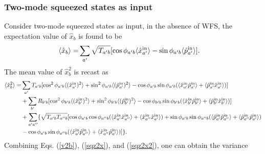 \documentclass[9pt,twocolumn,twoside]{osajnl}
\begin{document}
\subsubsection{Two-mode squeezed states as input}
\label{apptwomode}
Consider two-mode squeezed states as input, in the absence of WFS, the expectation value of $\hat{x}_b$ is found to be
\begin{align}
\label{sqz2x}
\langle \hat{x}_b \rangle =& \sum_{a'} {\sqrt{T_{a'b}} [ \cos \phi_{a'b} \langle \hat{x}_{a'}^{\rm{in}} \rangle - \sin \phi_{a'b} \langle \hat{p}_{a'}^{\rm{in}} \rangle] }.
\end{align}
The mean value of $\hat{x}_b^2$ is recast as
\begin{align}
\label{sqz2x2}
\langle \hat{x}_b^2 \rangle =& \sum_{a'} {T_{a'b} [ \cos^2 \phi_{a'b} \langle (\hat{x}_{a'}^{\rm{in}})^2 \rangle + \sin^2 \phi_{a'b} \langle (\hat{p}_{a'}^{\rm{in}})^2 \rangle - \cos \phi_{a'b} \sin \phi_{a'b} (\langle \hat{x}_{a'}^{\rm{in}} \hat{p}_{a'}^{\rm{in}} \rangle + \langle \hat{p}_{a'}^{\rm{in}} \hat{x}_{a'}^{\rm{in}} \rangle) ] }\\ \nonumber
& +  \sum_{b'} {R_{b'b} [ \cos^2 \phi_{b'b} \langle (\hat{x}_{b'}^{\rm{in}})^2 \rangle + \sin^2 \phi_{b'b} \langle (\hat{p}_{b'}^{\rm{in}})^2 \rangle - \cos \phi_{b'b} \sin \phi_{b'b} (\langle \hat{x}_{b'}^{\rm{in}} \hat{p}_{b'}^{\rm{in}} \rangle + \langle \hat{p}_{b'}^{\rm{in}} \hat{x}_{b'}^{\rm{in}} \rangle) ] }\\ \nonumber
& + \sum_{a'a''} \{ \sqrt{T_{a'b} T_{a''b}} [\cos \phi_{a' b} \cos \phi_{a''b} (\langle \hat{x}_{a'}^{\rm{in}} \hat{x}_{a''}^{\rm{in}} \rangle + \langle \hat{x}_{a''}^{\rm{in}} \hat{x}_{a'}^{\rm{in}} \rangle) + \sin \phi_{a' b} \sin \phi_{a''b} (\langle \hat{p}_{a'}^{\rm{in}} \hat{p}_{a''}^{\rm{in}} \rangle + \langle \hat{p}_{a''}^{\rm{in}} \hat{p}_{a'}^{\rm{in}} \rangle) \\ \nonumber
& - \cos \phi_{a' b} \sin \phi_{a''b} (\langle \hat{x}_{a'}^{\rm{in}} \hat{p}_{a''}^{\rm{in}} \rangle + \langle \hat{x}_{a''}^{\rm{in}} \hat{p}_{a'}^{\rm{in}} \rangle) ]  \}.
\end{align}
Combining Eqs. (\ref{v2b}), (\ref{sqz2x}), and (\ref{sqz2x2}), one can obtain the variance
\end{document}
